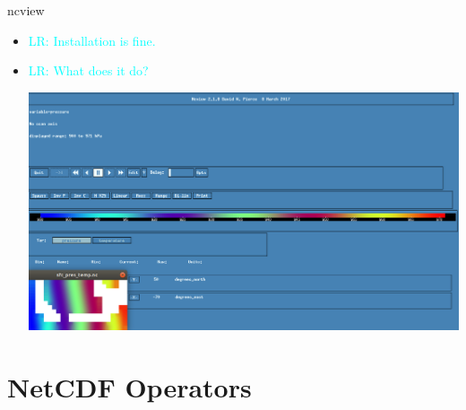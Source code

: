 \documentclass[compress,11pt,xcolor=svgnames,aspectratio=169]{beamer}
\newcommand{\lr}[1]{\textcolor{cyan}{LR: #1}}
\begin{document}
\begin{frame}[fragile]{ncview}

\begin{itemize}

  \item \lr{Installation is fine.}
  \item \lr{What does it do?}

  \begin{center}
  \includegraphics[scale=0.3]{fig/ncview}
  \end{center}

\end{itemize}

\end{frame}

\section{NetCDF Operators}
\end{document}
